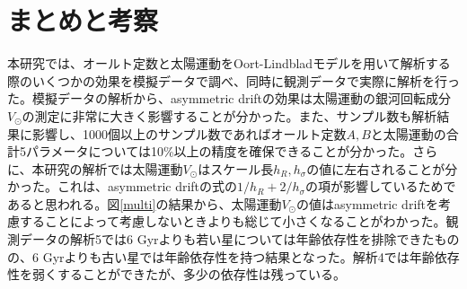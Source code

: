 \chapter{まとめと考察}
本研究では、オールト定数と太陽運動をOort-Lindbladモデルを用いて解析する際のいくつかの効果を模擬データで調べ、同時に観測データで実際に解析を行った。模擬データの解析から、asymmetric driftの効果は太陽運動の銀河回転成分$V_{\odot}$の測定に非常に大きく影響することが分かった。また、サンプル数も解析結果に影響し、1000個以上のサンプル数であればオールト定数$A,B$と太陽運動の合計5パラメータについては10\%以上の精度を確保できることが分かった。さらに、本研究の解析では太陽運動$V_{\odot}$はスケール長$h_R,h_{\sigma}$の値に左右されることが分かった。これは、asymmetric driftの式の$1/h_R + 2/h_{\sigma}$の項が影響しているためであると思われる。図\ref{multi}の結果から、太陽運動$V_{\odot}$の値はasymmetric driftを考慮することによって考慮しないときよりも総じて小さくなることがわかった。観測データの解析5では6  Gyrよりも若い星については年齢依存性を排除できたものの、6 Gyrよりも古い星では年齢依存性を持つ結果となった。解析4では年齢依存性を弱くすることができたが、多少の依存性は残っている。